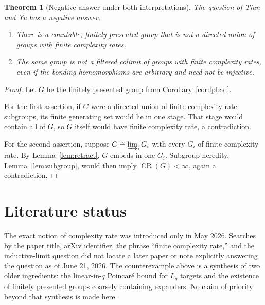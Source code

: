 \documentclass[11pt]{article}
\newtheorem{theorem}{Theorem}[section]
\newcommand{\CR}{\operatorname{CR}}
\newcommand{\directlim}{\varinjlim}
\begin{document}
\begin{theorem}[Negative answer under both interpretations]\label{thm:negative}
The question of Tian and Yu has a negative answer.
\begin{enumerate}
  \item There is a countable, finitely presented group that is not a directed union of groups with finite complexity rates.
  \item The same group is not a filtered colimit of groups with finite complexity rates, even if the bonding homomorphisms are arbitrary and need not be injective.
\end{enumerate}
\end{theorem}

\begin{proof}
Let $G$ be the finitely presented group from Corollary~\ref{cor:fpbad}.

For the first assertion, if $G$ were a directed union of finite-complexity-rate subgroups, its finite generating set would lie in one stage.  That stage would contain all of $G$, so $G$ itself would have finite complexity rate, a contradiction.

For the second assertion, suppose $G\cong\directlim_i G_i$ with every $G_i$ of finite complexity rate.  By Lemma~\ref{lem:retract}, $G$ embeds in one $G_i$.  Subgroup heredity, Lemma~\ref{lem:subgroup}, would then imply $\CR(G)<\infty$, again a contradiction.
\end{proof}

\section{Literature status}

The exact notion of complexity rate was introduced only in May 2026.  Searches by the paper title, arXiv identifier, the phrase ``finite complexity rate,'' and the inductive-limit question did not locate a later paper or note explicitly answering the question as of June 21, 2026.  The counterexample above is a synthesis of two older ingredients: the linear-in-$q$ Poincar\'e bound for $L_q$ targets and the existence of finitely presented groups coarsely containing expanders.  No claim of priority beyond that synthesis is made here.
\end{document}
